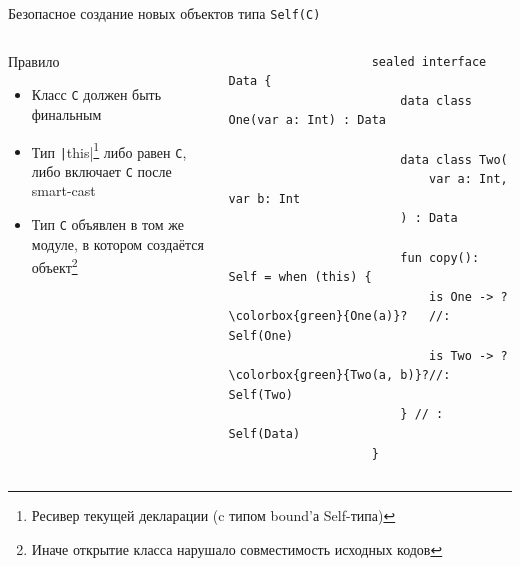 \documentclass[usenames, dvipsnames]{beamer}
\begin{document}
    \begin{frame}[fragile]{Безопасное создание новых объектов типа \texttt{Self(C)}}
        \begin{columns}[onlytextwidth]
            \begin{column}[t]{0.46\textwidth}
                \begin{block}{Правило}
                    \begin{itemize}
                        \item Класс \texttt{C} должен быть финальным
                        \item Тип \texttt|this|\footnote{Ресивер текущей декларации (c типом bound'а Self-типа)} либо равен \texttt{С}, либо включает \texttt{C} после smart-cast
                        \item Тип \texttt{C} объявлен в том же модуле, в котором создаётся объект\footnote{Иначе открытие класса нарушало совместимость исходных кодов}
                    \end{itemize}
                \end{block}
            \end{column}\hfill%
            \begin{column}[t]{0.50\textwidth}
                \begin{verbatim}
                    sealed interface Data {
                        data class One(var a: Int) : Data

                        data class Two(
                            var a: Int, var b: Int
                        ) : Data

                        fun copy(): Self = when (this) {
                            is One -> ?\colorbox{green}{One(a)}?   //: Self(One)
                            is Two -> ?\colorbox{green}{Two(a, b)}?//: Self(Two)
                        } // : Self(Data)
                    }
                \end{verbatim}
            \end{column}
        \end{columns}
    \end{frame}
\end{document}

